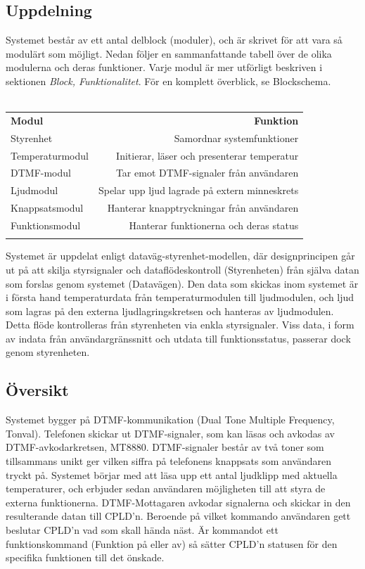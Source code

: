 \documentclass[a4paper,11pt]{article}
\begin{document}
	\subsection{Uppdelning}

	Systemet består av ett antal delblock (moduler), och är skrivet för att vara så modulärt som möjligt.
	Nedan följer en sammanfattande tabell över de olika modulerna och deras funktioner. Varje modul är mer
	utförligt beskriven i sektionen {\it Block, Funktionalitet}. För en komplett överblick, se Blockschema. \\\\

	\begin{tabular}{l r}
		{\bf Modul} & {\bf Funktion}\\
	   	Styrenhet & Samordnar systemfunktioner\\
	  	Temperaturmodul & Initierar, läser och presenterar temperatur\\
	   	DTMF-modul & Tar emot DTMF-signaler från användaren\\
		Ljudmodul & Spelar upp ljud lagrade på extern minneskrets\\
		Knappsatsmodul & Hanterar knapptryckningar från användaren\\
		Funktionsmodul & Hanterar funktionerna och deras status\\\\
	\end{tabular}

	Systemet är uppdelat enligt dataväg-styrenhet-modellen, där designprincipen går ut på att skilja styrsignaler
	och dataflödeskontroll (Styrenheten) från själva datan som forslas genom systemet (Datavägen). Den data som
	skickas inom systemet är i första hand temperaturdata från temperaturmodulen till ljudmodulen, och ljud som
	lagras på den externa ljudlagringskretsen och hanteras av ljudmodulen. Detta flöde kontrolleras från styrenheten via
	enkla styrsignaler. Viss data, i form av indata från användargränssnitt och utdata till funktionsstatus, passerar
	dock genom styrenheten.

	\subsection{Översikt}

	Systemet bygger på DTMF-kommunikation (Dual Tone Multiple Frequency, Tonval). Telefonen skickar ut DTMF-signaler, som kan
	läsas och avkodas av DTMF-avkodarkretsen, MT8880. DTMF-signaler består av två toner som tillsammans unikt ger vilken
	siffra på telefonens knappsats som användaren tryckt på. Systemet börjar med att läsa upp ett antal ljudklipp med
	aktuella temperaturer, och erbjuder sedan användaren möjligheten till att styra de externa funktionerna.
	DTMF-Mottagaren avkodar signalerna och skickar in den resulterande
	datan till CPLD'n. Beroende på vilket kommando användaren gett beslutar CPLD'n vad som skall hända näst. Är kommandot ett
	funktionskommand (Funktion på eller av) så sätter CPLD'n statusen för den specifika funktionen till det önskade. 
\end{document}
